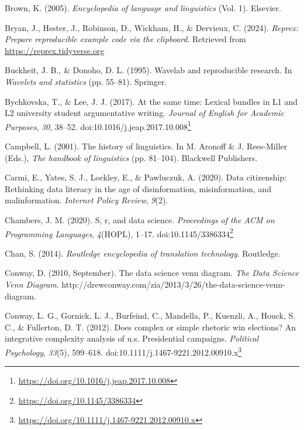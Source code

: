 \documentclass[
  letterpaper,
]{book}
\newlength{\cslhangindent}
\newenvironment{CSLReferences}[2] %
 {\begin{list}{}{%
  \setlength{\itemindent}{0pt}
  \setlength{\leftmargin}{0pt}
  \setlength{\parsep}{0pt}
  \ifodd #1
   \setlength{\leftmargin}{\cslhangindent}
   \setlength{\itemindent}{-1\cslhangindent}
  \fi
  \setlength{\itemsep}{#2\baselineskip}}}
 {\end{list}}
\theoremstyle{definition}
\theoremstyle{remark}
\DeclareRobustCommand{\href}[2]{#2\footnote{\url{#1}}}
\begin{document}
\begin{CSLReferences}{1}{0}
Brown, K. (2005). \emph{Encyclopedia of language and linguistics} (Vol.
1). Elsevier.

Bryan, J., Hester, J., Robinson, D., Wickham, H., \& Dervieux, C.
(2024). \emph{Reprex: Prepare reproducible example code via the
clipboard}. Retrieved from \url{https://reprex.tidyverse.org}

Buckheit, J. B., \& Donoho, D. L. (1995). Wavelab and reproducible
research. In \emph{Wavelets and statistics} (pp. 55--81). Springer.

Bychkovska, T., \& Lee, J. J. (2017). At the same time: Lexical bundles
in L1 and L2 university student argumentative writing. \emph{Journal of
English for Academic Purposes}, \emph{30}, 38--52.
doi:\href{https://doi.org/10.1016/j.jeap.2017.10.008}{10.1016/j.jeap.2017.10.008}

Campbell, L. (2001). The history of linguistics. In M. Aronoff \& J.
Rees-Miller (Eds.), \emph{The handbook of linguistics} (pp. 81--104).
Blackwell Publishers.

Carmi, E., Yates, S. J., Lockley, E., \& Pawluczuk, A. (2020). Data
citizenship: Rethinking data literacy in the age of disinformation,
misinformation, and malinformation. \emph{Internet Policy Review},
\emph{9}(2).

Chambers, J. M. (2020). S, r, and data science. \emph{Proceedings of the
ACM on Programming Languages}, \emph{4}(HOPL), 1--17.
doi:\href{https://doi.org/10.1145/3386334}{10.1145/3386334}

Chan, S. (2014). \emph{Routledge encyclopedia of translation
technology}. Routledge.

Conway, D. (2010, September). The data science venn diagram. \emph{The
Data Science Venn Diagram}.
http://drewconway.com/zia/2013/3/26/the-data-science-venn-diagram.

Conway, L. G., Gornick, L. J., Burfeind, C., Mandella, P., Kuenzli, A.,
Houck, S. C., \& Fullerton, D. T. (2012). Does complex or simple
rhetoric win elections? An integrative complexity analysis of u.s.
Presidential campaigns. \emph{Political Psychology}, \emph{33}(5),
599--618.
doi:\href{https://doi.org/10.1111/j.1467-9221.2012.00910.x}{10.1111/j.1467-9221.2012.00910.x}


\end{CSLReferences}
\end{document}
